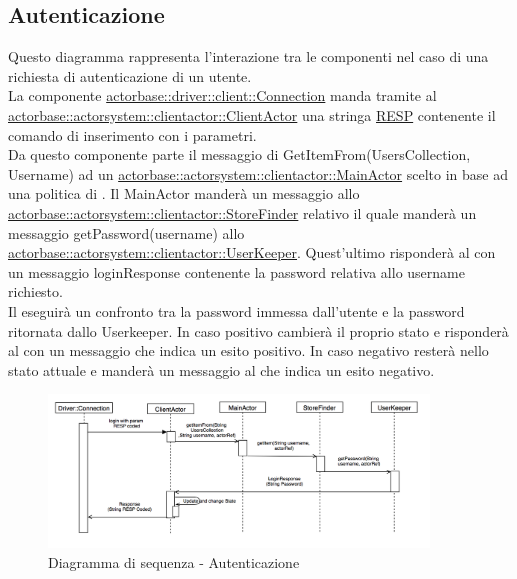 \documentclass{scalatekids-article}
\begin{document}
\subsection{Autenticazione}

Questo diagramma rappresenta l'interazione tra le componenti nel caso di una richiesta di autenticazione di un utente.\\
La componente \hyperref[sec:actorbase::driver::client::Connection]{actorbase::driver::client::Connection}
manda tramite  al \hyperref[sec:actorbase::actorsystem::clientactor::ClientActor]{actorbase::actorsystem::clientactor::ClientActor}
una stringa \hyperref[sec:RESP]{RESP} contenente il comando di inserimento  con
i parametri.\\
Da questo componente parte il messaggio di GetItemFrom(UsersCollection, Username) ad un \hyperref[sec:actorbase::actorsystem::clientactor::MainActor]{actorbase::actorsystem::clientactor::MainActor} scelto in base ad una
politica di . Il MainActor manderà un messaggio allo \hyperref[sec:actorbase::actorsystem::clientactor::StoreFinder]{actorbase::actorsystem::clientactor::StoreFinder} relativo il quale manderà un messaggio getPassword(username) allo \hyperref[sec:actorbase::actorsystem::clientactor::UserKeeper]{actorbase::actorsystem::clientactor::UserKeeper}. Quest'ultimo risponderà al  con un messaggio loginResponse contenente la password relativa allo username richiesto.\\
Il  eseguirà un confronto tra la password immessa dall'utente e la password ritornata dallo Userkeeper. In caso positivo cambierà il proprio stato
e risponderà al  con un messaggio che indica un esito positivo. In caso negativo resterà nello stato attuale e manderà un messaggio al  che indica un esito negativo.
\begin{figure}[H]
  \begin{center}
    \includegraphics[width=0.9\textwidth, keepaspectratio]{img/diagrammiSequenza/esempioAuth.png}
    \caption{Diagramma di sequenza - Autenticazione}
  \end{center}
\end{figure}
\end{document}

